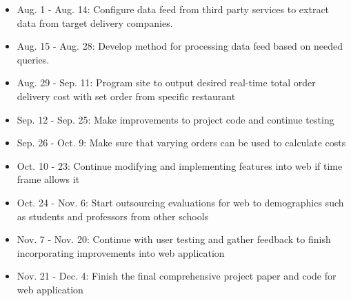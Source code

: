 \documentclass[10pt,twocolumn]{article}
\begin{document}
\begin{itemize}
    \item Aug. 1 - Aug. 14: Configure data feed from third party services to extract data from target delivery companies.
    \item Aug. 15 - Aug. 28: Develop method for processing data feed based on needed queries.
    \item Aug. 29 - Sep. 11: Program site to output desired real-time total order delivery cost with set order from specific restaurant
    \item Sep. 12 - Sep. 25: Make improvements to project code and continue testing
    \item Sep. 26 - Oct. 9: Make sure that varying orders can be used to calculate costs
    \item Oct. 10 - 23: Continue modifying and implementing features into web if time frame allows it
    \item Oct. 24 - Nov. 6: Start outsourcing evaluations for web to demographics such as students and professors from other schools
    \item Nov. 7 - Nov. 20: Continue with user testing and gather feedback to finish incorporating improvements into web application
    \item Nov. 21 - Dec. 4: Finish the final comprehensive project paper and code for web application
 
\end{itemize}

\printbibliography
\end{document}

